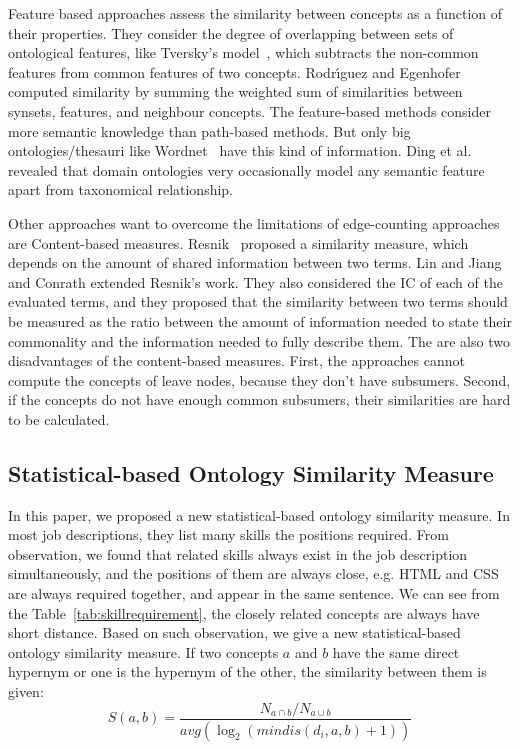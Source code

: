Feature based approaches assess the similarity between concepts as a function of their properties. They consider the degree of overlapping between sets of ontological features, like Tversky's model~\cite{tverskyfeatures}, which subtracts the non-common features from common features of two concepts. 
Rodr{\'\i}guez and Egenhofer~\cite{rodriguez2003determining} computed similarity by summing the weighted sum of similarities between synsets, features, and neighbour concepts. The feature-based methods consider more semantic knowledge than path-based methods. But only big ontologies/thesauri like Wordnet~\cite{miller1995wordnet} have this kind of information. Ding et al.~\cite{ding2004swoogle} revealed that domain ontologies very occasionally model any semantic feature apart from taxonomical relationship.


Other approaches want to overcome the limitations of edge-counting approaches are Content-based measures. Resnik~\cite{resnik1995using} proposed a similarity measure, which depends on the amount of shared information between two terms. Lin \cite{lin1998information} and Jiang and Conrath \cite{jiang1997semantic} extended Resnik's work. They also considered the IC of each of the evaluated terms, and they proposed that the similarity between two terms should be measured as the ratio between the amount of information needed to state their commonality and the information needed to fully describe them. The are also two disadvantages of the content-based measures. First, the approaches cannot compute the concepts of leave nodes, because they don't have subsumers. Second, if the concepts do not have enough common subsumers, their similarities are hard to be calculated.


\subsection{Statistical-based Ontology Similarity Measure }
In this paper, we proposed a new statistical-based ontology similarity measure. In most job descriptions, they list many skills the positions required. From observation, we found that related skills always exist in the job description simultaneously, and the positions of them are always close, e.g. HTML and CSS are always required together, and appear in the same sentence. We can see from the Table~\ref{tab:skillrequirement}, the closely related concepts are always have short distance. Based on such observation, we give a new statistical-based ontology similarity measure. If two concepts $a$ and $b$ have the same direct hypernym or one  is the hypernym of the other, the similarity between them is given:
$$ S(a,b) = \frac{  N_{a \cap b} / N_{a \cup b} }{avg(\log_2( mindis(d_i,a,b) + 1 ))} $$

